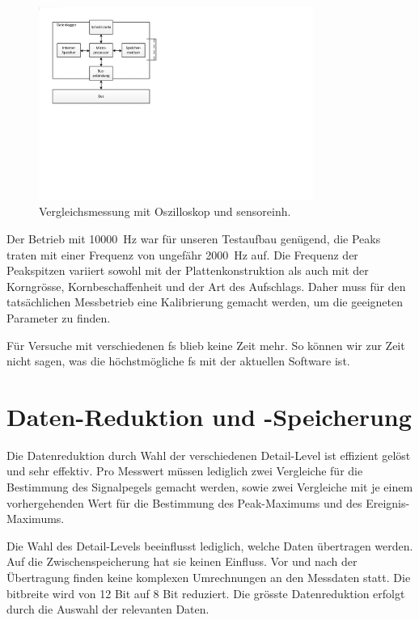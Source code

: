 \begin{figure}
	\centering
		\includegraphics[width=0.8\textwidth]{images/visio/hardwarekonzept_logger.pdf}
	\caption{Vergleichsmessung mit Oszilloskop und \gls{sensoreinh}.}
	\label{fig.comparison}
\end{figure}


Der Betrieb mit 10000~Hz war für unseren Testaufbau genügend, die Peaks traten mit einer Frequenz von ungefähr 2000~Hz auf. Die Frequenz der Peakspitzen variiert sowohl mit der Plattenkonstruktion als auch mit der Korngrösse, Kornbeschaffenheit und der Art des Aufschlags. Daher muss für den tatsächlichen Messbetrieb eine Kalibrierung gemacht werden, um die geeigneten Parameter zu finden.

Für Versuche mit verschiedenen \gls{fs} blieb keine Zeit mehr. So können wir zur Zeit nicht sagen, was die höchstmögliche \gls{fs} mit der aktuellen Software ist.

\section{Daten-Reduktion und -Speicherung}
Die Datenreduktion durch Wahl der verschiedenen Detail-Level ist effizient gelöst und sehr effektiv. Pro Messwert müssen lediglich zwei Vergleiche für die Bestimmung des Signalpegels gemacht werden, sowie zwei Vergleiche mit je einem vorhergehenden Wert für die Bestimmung des Peak-Maximums und des Ereignis-Maximums.

Die Wahl des Detail-Levels beeinflusst lediglich, welche Daten übertragen werden. Auf die Zwischenspeicherung hat sie keinen Einfluss. Vor und nach der Übertragung finden keine komplexen Umrechnungen an den Messdaten statt. Die \gls{bitbreite} wird von 12 Bit auf 8 Bit reduziert. Die grösste Datenreduktion erfolgt durch die Auswahl der relevanten Daten.

